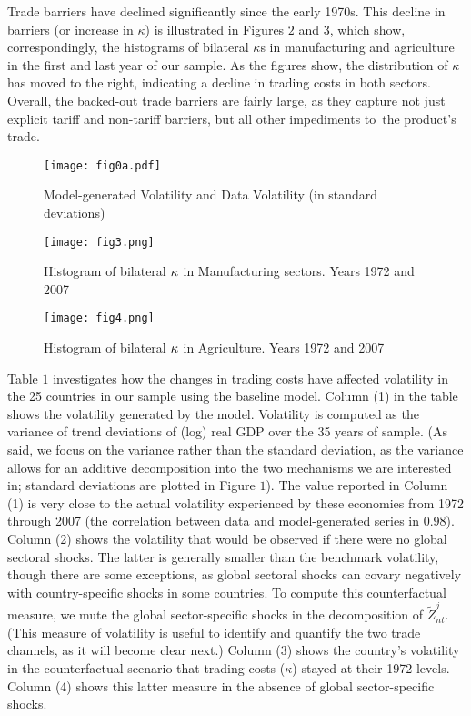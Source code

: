 \documentclass[12pt]{article}
\begin{document}
Trade barriers have declined significantly since the early 1970s. This
decline in barriers (or increase in $\kappa $) is illustrated in Figures $2$
and $3$, which show, correspondingly, the histograms of bilateral $\kappa $s
in manufacturing and agriculture in the first and last year of our sample.
As the figures show, the distribution of $\kappa $ has moved to the right,
indicating a decline in trading costs in both sectors. Overall, the
backed-out trade barriers are fairly large, as they capture not just
explicit tariff and non-tariff barriers, but all other impediments to\ the
product's trade.

\medskip

\begin{figure}[h]
\caption{Model-generated Volatility and Data Volatility (in standard
deviations)}\centering\texttt{[image: fig0a.pdf]}
\end{figure}
\medskip 
\begin{figure}[h]
\caption{Histogram of bilateral $\protect\kappa $ in Manufacturing sectors.
Years 1972 and 2007}\centering\texttt{[image: fig3.png]}
\end{figure}

\begin{figure}[h]
\caption{Histogram of bilateral $\protect\kappa $ in Agriculture. Years 1972
and 2007}\centering\texttt{[image: fig4.png]}
\end{figure}

Table $1$ investigates how the changes in trading costs have affected
volatility in the 25 countries in our sample using the baseline model.
Column (1) in the table shows the volatility generated by the model.
Volatility is computed as the variance of trend deviations of (log) real GDP
over the 35 years of sample. (As said, we focus on the variance rather than
the standard deviation, as the variance allows for an additive decomposition
into the two mechanisms we are interested in; standard deviations are
plotted in Figure $1$). The value reported in Column (1) is very close to
the actual volatility experienced by these economies from 1972 through 2007
(the correlation between data and model-generated series in 0.98). Column
(2) shows the volatility that would be observed if there were no global
sectoral shocks. The latter is generally smaller than the benchmark
volatility, though there are some exceptions, as global sectoral shocks can
covary negatively with country-specific shocks in some countries. To compute
this counterfactual measure, we mute the global sector-specific shocks in
the decomposition of $\tilde{Z}_{nt}^{j}$. (This measure of volatility is
useful to identify and quantify the two trade channels, as it will become
clear next.) Column (3) shows the country's volatility in the counterfactual
scenario that trading costs ($\kappa $) stayed at their 1972 levels. Column
(4) shows this latter measure in the absence of global sector-specific
shocks.
\end{document}
